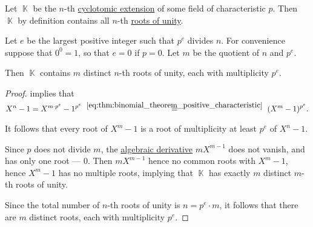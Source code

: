 \begin{lemma}\label{thm:roots_of_unity_multiplicity}
  Let \( \BbbK \) be the \( n \)-th \hyperref[def:cyclotomic_extension]{cyclotomic extension} of some field of characteristic \( p \). Then \( \BbbK \) by definition contains all \( n \)-th \hyperref[def:root_of_unity]{roots of unity}.

  Let \( e \) be the largest positive integer such that \( p^e \) divides \( n \). For convenience suppose that \( 0^0 = 1 \), so that \( e = 0 \) if \( p = 0 \). Let \( m \) be the quotient of \( n \) and \( p^e \).

  Then \( \BbbK \) contains \( m \) distinct \( n \)-th roots of unity, each with multiplicity \( p^e \).
\end{lemma}
\begin{proof}
   implies that
  \begin{equation}\label{eq:thm:roots_of_unity_multiplicity/proof}
    X^n - 1
    =
    X^{m \cdot p^e} - 1^{p^e}
    \reloset {\eqref{eq:thm:binomial_theorem_positive_characteristic}} =
    (X^m - 1)^{p^e}.
  \end{equation}

  It follows that every root of \( X^m - 1 \) is a root of multiplicity at least \( p^e \) of \( X^n - 1 \).

  Since \( p \) does not divide \( m \), the \hyperref[def:algebraic_derivative]{algebraic derivative} \( m X^{m - 1} \) does not vanish, and has only one root --- \( 0 \). Then \( m X^{m-1} \) hence no common roots with \( X^m - 1 \), hence \( X^m - 1 \) has no multiple roots, implying that \( \BbbK \) has exactly \( m \) distinct \( m \)-th roots of unity.

  Since the total number of \( n \)-th roots of unity is \( n = p^e \cdot m \), it follows that there are \( m \) distinct roots, each with multiplicity \( p^e \).
\end{proof}

